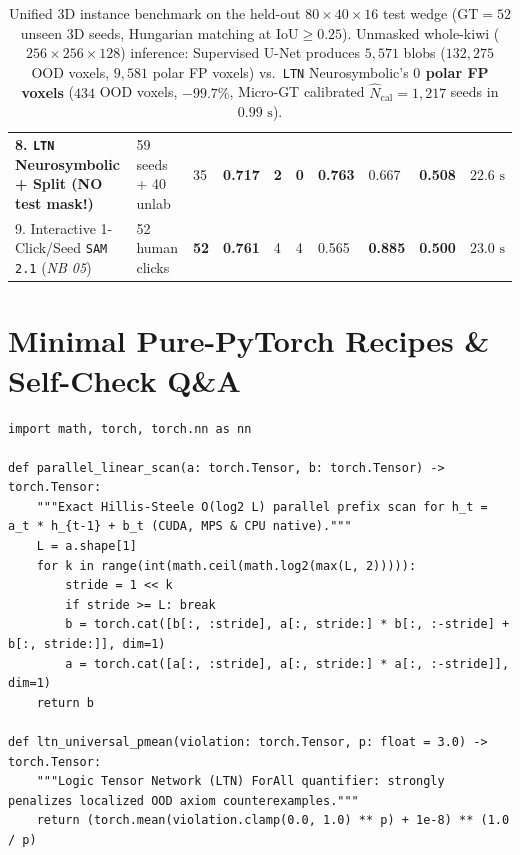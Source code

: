 \documentclass[10.5pt,a4paper]{article}
\begin{document}
\begin{table}[H]
\begin{tabularx}{\textwidth}{Y C{1.55cm} C{1.05cm} C{0.82cm} C{0.82cm} C{0.72cm} C{0.78cm} C{0.85cm} C{0.80cm} R{1.45cm}}
\textbf{8. \texttt{LTN} Neurosymbolic + Split (NO test mask!)} & 59 seeds + 40 unlab & 35 & \textbf{0.717} & \textbf{2} & \textbf{0} & \textbf{0.763} & 0.667 & \textbf{0.508} & $22.6\text{ s}$ \\
9. Interactive 1-Click/Seed \texttt{SAM 2.1} (\emph{NB 05}) & 52 human clicks & \textbf{52} & \textbf{0.761} & 4 & 4 & 0.565 & \textbf{0.885} & \textbf{0.500} & $23.0\text{ s}$ \\
\bottomrule
\end{tabularx}
\caption{Unified 3D instance benchmark on the held-out $80\times 40\times 16$ test wedge ($\text{GT}=52$ unseen 3D seeds, Hungarian matching at $\text{IoU}\ge 0.25$). Unmasked whole-kiwi ($256\times 256\times 128$) inference: Supervised U-Net produces $5{,}571$ blobs ($132{,}275$ OOD voxels, $9{,}581$ polar FP voxels) vs.\ \texttt{LTN} Neurosymbolic's \textbf{$0$ polar FP voxels} ($434$ OOD voxels, $-99.7\%$, Micro-GT calibrated $\widehat{N}_{\text{cal}} = 1{,}217$ seeds in $0.99\text{ s}$).}
\end{table}

\section{Minimal Pure-PyTorch Recipes \& Self-Check Q\&A}

\begin{lstlisting}[style=pybmed]
import math, torch, torch.nn as nn

def parallel_linear_scan(a: torch.Tensor, b: torch.Tensor) -> torch.Tensor:
    """Exact Hillis-Steele O(log2 L) parallel prefix scan for h_t = a_t * h_{t-1} + b_t (CUDA, MPS & CPU native)."""
    L = a.shape[1]
    for k in range(int(math.ceil(math.log2(max(L, 2))))):
        stride = 1 << k
        if stride >= L: break
        b = torch.cat([b[:, :stride], a[:, stride:] * b[:, :-stride] + b[:, stride:]], dim=1)
        a = torch.cat([a[:, :stride], a[:, stride:] * a[:, :-stride]], dim=1)
    return b

def ltn_universal_pmean(violation: torch.Tensor, p: float = 3.0) -> torch.Tensor:
    """Logic Tensor Network (LTN) ForAll quantifier: strongly penalizes localized OOD axiom counterexamples."""
    return (torch.mean(violation.clamp(0.0, 1.0) ** p) + 1e-8) ** (1.0 / p)
\end{lstlisting}
\end{document}
